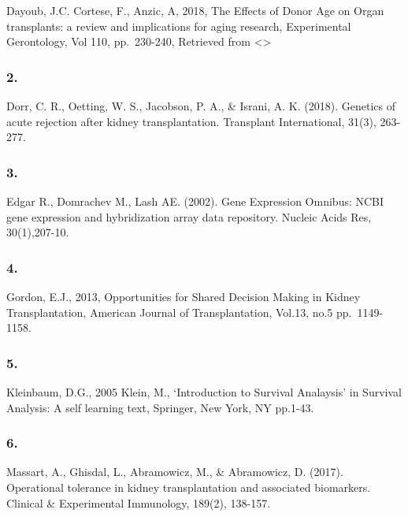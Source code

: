 \documentclass[a4paper,9pt,twocolumn,twoside,]{pinp}
\begin{document}
Dayoub, J.C. Cortese, F., Anzic, A, 2018, The Effects of Donor Age on
Organ transplants: a review and implications for aging research,
Experimental Gerontology, Vol 110, pp.~230-240, Retrieved from
\textless{}\textgreater{}

\hypertarget{section-1}{%
\subsubsection{2.}\label{section-1}}

Dorr, C. R., Oetting, W. S., Jacobson, P. A., \& Israni, A. K. (2018).
Genetics of acute rejection after kidney transplantation. Transplant
International, 31(3), 263-277.

\hypertarget{section-2}{%
\subsubsection{3.}\label{section-2}}

Edgar R., Domrachev M., Lash AE. (2002). Gene Expression Omnibus: NCBI
gene expression and hybridization array data repository. Nucleic Acids
Res, 30(1),207-10.

\hypertarget{section-3}{%
\subsubsection{4.}\label{section-3}}

Gordon, E.J., 2013, Opportunities for Shared Decision Making in Kidney
Transplantation, American Journal of Transplantation, Vol.13, no.5
pp.~1149-1158.

\hypertarget{section-4}{%
\subsubsection{5.}\label{section-4}}

Kleinbaum, D.G., 2005 Klein, M., `Introduction to Survival Analaysis' in
Survival Analysis: A self learning text, Springer, New York, NY pp.1-43.

\hypertarget{section-5}{%
\subsubsection{6.}\label{section-5}}

Massart, A., Ghisdal, L., Abramowicz, M., \& Abramowicz, D. (2017).
Operational tolerance in kidney transplantation and associated
biomarkers. Clinical \& Experimental Immunology, 189(2), 138-157.
\end{document}
